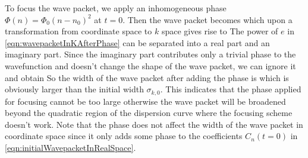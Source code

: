 To focus the wave packet, we apply an inhomogeneous phase $\Phi(n) = \Phi_0 (n-n_0)^2$ at $t=0$.  Then the wave 
packet becomes
which upon a transformation from coordinate space to $k$ space gives rise to
The power of $e$ in \autoref{eqn:wavepacketInKAfterPhase} can be separated into a real part and an imaginary part.
Since the imaginary part contributes only a trivial phase to the wavefunction and doesn't change the shape of the 
wave packet, we can ignore it and obtain
So the width of the wave packet after adding the phase is
which is obviously larger than the initial width  $\sigma_{k, 0}$. This indicates that the phase applied for focusing
cannot be too large otherwise the wave packet will be broadened beyond the quadratic region of the dispersion
 curve where the focusing scheme doesn't work. Note that the phase does not affect the width of the wave packet 
 in coordinate space since it only adds some phase to the coefficients $C_n(t=0)$ in
 \autoref{eqn:initialWavepacketInRealSpace}. 


